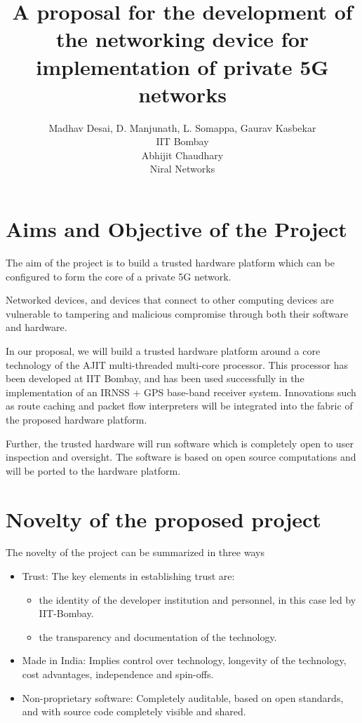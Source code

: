 \documentclass{article}
\title{A proposal for the development of the networking device  for implementation of  private 5G networks}
\author{Madhav Desai, D. Manjunath, L. Somappa, Gaurav Kasbekar\\ IIT Bombay\\ Abhijit Chaudhary \\ Niral Networks}
\begin{document}
\maketitle

\section{Aims and Objective of the Project}

	The aim of the project is to build a trusted hardware platform
	which can be configured to form the core of a private 5G network.

	Networked devices, and devices that connect to other computing devices are 
	vulnerable to tampering and malicious compromise through both their software and hardware. 

	In our proposal, we will build a trusted hardware platform around 
	a core technology of the AJIT multi-threaded multi-core processor.   
	This processor has been developed at IIT Bombay, and has been used 
	successfully in the implementation of an IRNSS + GPS
	base-band receiver system.   Innovations such as route caching and packet
	flow interpreters will be integrated into the fabric of the proposed hardware
	platform.

	Further, the trusted hardware will run software which is completely open
	to user inspection and oversight.   The software is based on open source
	computations and will be ported to the hardware platform.


\section{Novelty of the proposed project}

	The novelty of the project can be summarized in three ways
	
	\begin{itemize}
	\item Trust:
		The key elements in establishing trust are: 
		\begin{itemize}
			\item the identity of the developer institution and personnel, in this case led
			by IIT-Bombay.

			\item the transparency and documentation of the technology.
		\end{itemize}
	\item Made in India:
		Implies control over technology, longevity of the technology,
		cost advantages, independence and spin-offs.

	\item Non-proprietary software:
		Completely auditable, based on open standards, and with source
		code completely visible and shared.
	\end{itemize}
\end{document}
